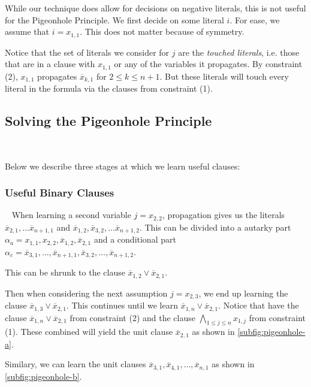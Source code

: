 While our technique does allow for decisions on negative literals, this is not useful for the Pigeonhole Principle. We first decide on some literal $i$. For ease, we assume that $i = x_{1, 1}$. This does not matter because of symmetry.

Notice that the set of literals we consider for $j$ are the \emph{touched literals}, i.e. those that are in a clause with $x_{1, 1}$ or any of the variables it propagates. By constraint (2), $x_{1, 1}$ propagates $\overline{x}_{k, 1}$ for $2 \leq k \leq n + 1$. But these literals will touch every literal in the formula via the clauses from constraint (1). 


\subsection{Solving the Pigeonhole Principle}~\label{subsec:solvingpigeonhole}

Below we describe three stages at which we learn useful clauses:


\subsubsection{Useful Binary Clauses}~\label{subec:usefulbinaryclauses} When learning a second variable $j= x_{2, 2}$, propagation gives us the literals $\overline{x}_{2, 1}, \dots \overline{x}_{n+1, 1}$ and $\overline{x}_{1, 2}, \overline{x}_{3, 2}, \dots \overline{x}_{n+1, 2}$. This can be divided into a autarky part $\alpha_a = x_{1, 1}, x_{2, 2}, \overline{x}_{1, 2}, \overline{x}_{2, 1}$ and a conditional part $\alpha_c = \overline{x}_{3, 1}, \ldots, \overline{x}_{n+1, 1}, \overline{x}_{3, 2}, \ldots, \overline{x}_{n+1, 2}$.

This can be shrunk to the clause $\overline{x}_{1, 2} \lor \overline{x}_{2, 1}$.

Then when considering the next assumption $j = x_{2, 3}$, we end up learning the clause $\overline{x}_{1, 3} \lor \overline{x}_{2, 1}$. This continues until we learn $\overline{x}_{1, n} \lor \overline{x}_{2, 1}$. Notice that have the clause $\overline{x}_{1, n} \lor \overline{x}_{2, 1}$ from constraint (2) and the clause $\bigwedge_{1 \leq j \leq n} x_{1, j}$ from constraint (1). These combined will yield the unit clause $\overline{x}_{2, 1}$ as shown in \autoref{subfig:pigeonhole-a}.

Similary, we can learn the unit clauses $\overline{x}_{3, 1}, \overline{x}_{4, 1}, \ldots, \overline{x}_{n, 1}$ as shown in \autoref{subfig:pigeonhole-b}.



